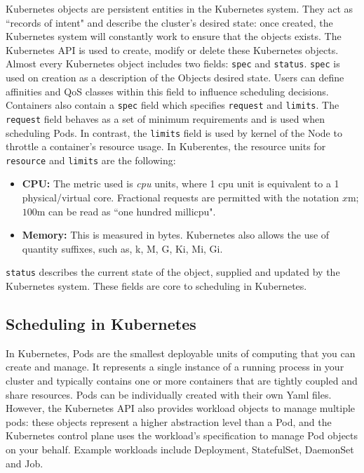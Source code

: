 Kubernetes objects are persistent entities in the Kubernetes system. They act as
``records of intent" and describe the cluster's desired state: once created, the
Kubernetes system will constantly work to ensure that the objects exists. The
Kubernetes API is used to create, modify or delete these Kubernetes objects. Almost
every Kubernetes object includes two fields: \verb|spec| and \verb|status|.
\verb|spec| is used on creation as a description of the Objects desired state.
Users can define affinities and QoS classes within this field to influence
scheduling decisions. Containers also contain a \verb|spec| field which
specifies \verb|request| and \verb|limits|. The \texttt{request} field behaves
as a set of minimum requirements and is used when scheduling Pods. In contrast,
the \texttt{limits} field is used by kernel of the Node to throttle a
container's resource usage. In Kuberentes, the resource units for
\texttt{resource} and \texttt{limits} are the following:
\begin{itemize}
    \item \textbf{CPU:} The metric used is \textit{cpu} units, where 1 cpu unit
        is equivalent to a 1 physical/virtual core. Fractional requests are
        permitted with the notation $x$m; $100$m can be read as ``one hundred
        millicpu".
    \item \textbf{Memory:} This is measured in bytes. Kubernetes also allows the
        use of quantity suffixes, such as, k, M, G, Ki, Mi, Gi.
\end{itemize}
\texttt{status} describes the current state of the object, supplied and updated
by the Kubernetes system. These fields are core to scheduling in Kubernetes.

\subsection{Scheduling in Kubernetes}
In Kubernetes, Pods are the smallest deployable units of computing that you can
create and manage. It represents a single instance of a running
process in your cluster and typically contains one or more containers that are
tightly coupled and share resources. Pods can be individually created with their
own Yaml files. However, the Kubernetes API also provides workload objects to
manage multiple pods: these objects represent a higher abstraction level than a
Pod, and the Kubernetes control plane uses the workload's specification to
manage Pod objects on your behalf. Example workloads include Deployment,
StatefulSet, DaemonSet and Job.

